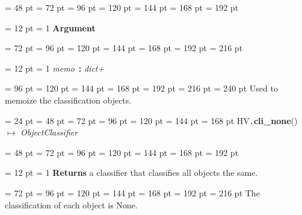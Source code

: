 {{{{\par}
{\par \noindent  \leftskip = 48 pt  \leftmargini = 72 pt  \leftmarginii = 96 pt  \leftmarginiii = 120 pt  \leftmarginiv = 144 pt  \leftmarginv = 168 pt  \leftmarginvi = 192 pt {\par \noindent
{\par \pagebreak[3.100000] \noindent \hangindent = 12 pt \hangafter = 1 
{\bf Argument\/}\par}
{\par \noindent  \leftskip = 72 pt  \leftmargini = 96 pt  \leftmarginii = 120 pt  \leftmarginiii = 144 pt  \leftmarginiv = 168 pt  \leftmarginv = 192 pt  \leftmarginvi = 216 pt {\par \noindent
{\par \pagebreak[3.000000] \noindent \hangindent = 12 pt \hangafter = 1 
{\em memo\/}~{\bf :}  {\em dict+\/}\par}
{\par \noindent  \leftskip = 96 pt  \leftmargini = 120 pt  \leftmarginii = 144 pt  \leftmarginiii = 168 pt  \leftmarginiv = 192 pt  \leftmarginv = 216 pt  \leftmarginvi = 240 pt  Used to memoize the classification objects.
\par}
\par}
\par}
\par}
\par}
\par}
\par}
{\par \noindent  \leftskip = 24 pt  \leftmargini = 48 pt  \leftmarginii = 72 pt  \leftmarginiii = 96 pt  \leftmarginiv = 120 pt  \leftmarginv = 144 pt  \leftmarginvi = 168 pt HV{\tt .\/}{\bf {\large {\bf cli{\_}none\/}}\/}() \(\mapsto \)  {\em ObjectClassifier\/}{\par \noindent
{\par \noindent  \leftskip = 48 pt  \leftmargini = 72 pt  \leftmarginii = 96 pt  \leftmarginiii = 120 pt  \leftmarginiv = 144 pt  \leftmarginv = 168 pt  \leftmarginvi = 192 pt {\par \noindent
{\par \pagebreak[3.100000] \noindent \hangindent = 12 pt \hangafter = 1 
{\bf Returns \/} a classifier that classifies all objects the same.\par}
{\par \noindent  \leftskip = 72 pt  \leftmargini = 96 pt  \leftmarginii = 120 pt  \leftmarginiii = 144 pt  \leftmarginiv = 168 pt  \leftmarginv = 192 pt  \leftmarginvi = 216 pt  The classification of each object is None.
}}}}}}
